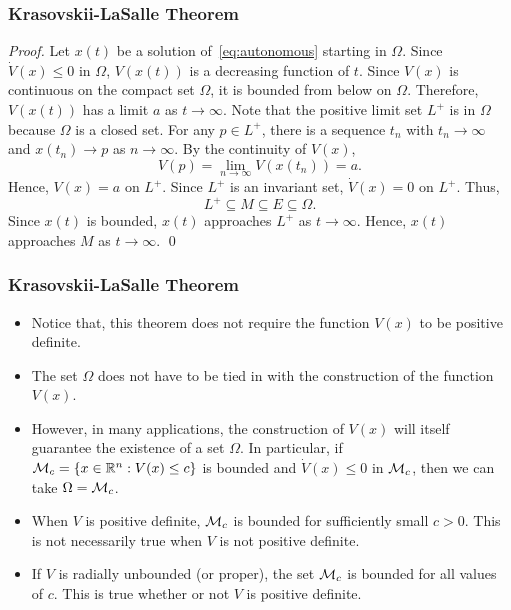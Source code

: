 \begin{frame}
    \frametitle{Krasovskii-LaSalle Theorem}

    \begin{proof}
        Let $x(t)$ be a solution of~\eqref{eq:autonomous} starting in $\Omega$.
        Since $\dot{V}(x) \leq 0$ in $\Omega$, $V(x(t))$ is a decreasing
        function of $t$. Since $V(x)$ is continuous on the compact set $\Omega$,
        it is bounded from below on $\Omega$. Therefore, $V(x(t))$ has a limit
        $a$ as $t \to \infty$. Note that the positive limit set $L^+$ is in
        $\Omega$ because $\Omega$ is a closed set. For any $p \in L^+$, there is
        a sequence $t_n$ with $t_n \to \infty$ and $x(t_n) \to p$ as $n \to
        \infty$. By the continuity of $V(x)$, \[V(p) = \lim_{n \to \infty}
        V(x(t_n)) = a.\] Hence, $V(x) = a$ on $L^+$. Since $L^+$ is an invariant
        set, $\dot{V}(x) = 0$ on $L^+$. Thus, \[ L^+ \subseteq M \subseteq E
        \subseteq \Omega. \] Since $x(t)$ is bounded, $x(t)$ approaches $L^+$ as 
        $t \to \infty$. Hence, $x(t)$ approaches $M$ as $t \to \infty$. \hfill 
        \qed
    \end{proof}
\end{frame}

\begin{frame}
    \frametitle{Krasovskii-LaSalle Theorem}

    \begin{itemize}
        \item Notice that, this theorem does not require the function $V(x)$ to 
        be positive definite.
        \item The set $\Omega$ does not have to be tied in with the construction
        of the function $V(x)$.
        \item However, in many applications, the construction of $V(x)$ will
        itself guarantee the existence of a set $\Omega$. In particular, if
        $\mathcal{M}_c = \{x \in \mathbb{R}^n: V(x) \leq c\}$ is bounded and
        $\dot{V}(x) \leq 0$ in $\mathcal{M}_c$, then we can take $\Omega = \mathcal{M}_c$.
        \item When $V$ is positive definite, $\mathcal{M}_c$ is bounded for
        sufficiently small $c > 0$. This is not necessarily true when $V$ is not
        positive definite.
        \item If $V$ is radially unbounded (or proper), the set $\mathcal{M}_c$ is
        bounded for all values of $c$. This is true whether or not $V$ is
        positive definite.
    \end{itemize}
\end{frame}

